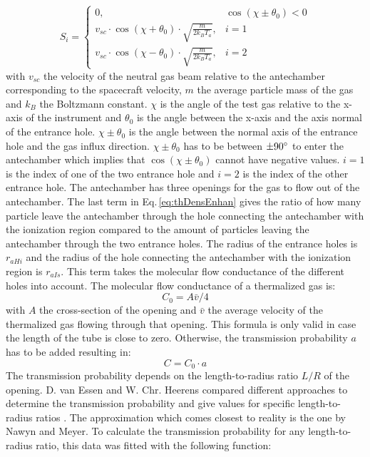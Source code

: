 		\begin{equation}
			S_i = 
			\begin{cases}
				0, & \cos(\chi \pm \theta_0) < 0\\
				v_{sc}\cdot \cos(\chi + \theta_0)\cdot \sqrt{\frac{m}{2k_B T_a}}, & i=1\\
				v_{sc}\cdot \cos(\chi - \theta_0)\cdot \sqrt{\frac{m}{2k_B T_a}}, & i=2
			\end{cases}
		\end{equation}
		with $v_{sc}$ the velocity of the neutral gas beam relative to the antechamber corresponding to the spacecraft velocity, $m$ the average particle mass of the gas and $k_B$ the Boltzmann constant. $\chi$ is the angle of the test gas relative to the x-axis of the instrument and $\theta_0$ is the angle between the x-axis and the axis normal of the entrance hole. $\chi \pm \theta_0$ is the angle between the normal axis of the entrance hole and the gas influx direction. $\chi \pm \theta_0$ has to be between $\pm 90^\circ$ to enter the antechamber which implies that $\cos(\chi \pm \theta_0)$ cannot have negative values. $i=1$ is the index of one of the two entrance hole and $i=2$ is the index of the other entrance hole. The antechamber has three openings for the gas to flow out of the antechamber. The last term in Eq.\,\eqref{eq:thDensEnhan} gives the ratio of how many particle leave the antechamber through the hole connecting the antechamber with the ionization region compared to the amount of particles leaving the antechamber through the two entrance holes. The radius of the entrance holes is $r_{aHi}$ and the radius of the hole connecting the antechamber with the ionization region is $r_{aIs}$. This term takes the molecular flow conductance of the different holes into account. The molecular flow conductance of a thermalized gas is:
		\begin{equation}
			C_0 = A\bar{v}/4
			\label{eq:theoMolFlowCondC0}
		\end{equation}
		with $A$ the cross-section of the opening and $\bar{v}$ the average velocity of the thermalized gas flowing through that opening. This formula is only valid in case the length of the tube is close to zero. Otherwise, the transmission probability $a$ has to be added resulting in:
		\begin{equation}
			C = C_0 \cdot a
			\label{eq:theoMolFlowCondCEff}
		\end{equation}
		The transmission probability depends on the length-to-radius ratio $L/R$ of the opening. D. van Essen and W. Chr. Heerens compared different approaches to determine the transmission probability and give values for specific length-to-radius ratios \cite{molFlowTubeTransm_Essen1976}. The approximation which comes closest to reality is the one by Nawyn and Meyer. To calculate the transmission probability for any length-to-radius ratio, this data was fitted with the following function:
